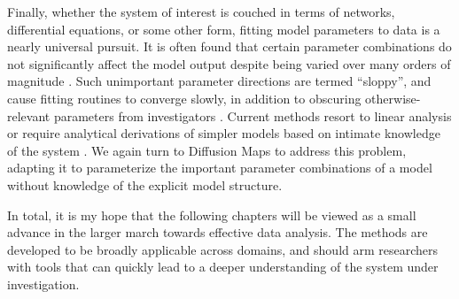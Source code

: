 Finally, whether the system of interest is couched in terms of
networks, differential equations, or some other form, fitting model
parameters to data is a nearly universal pursuit. It is often found
that certain parameter combinations do not significantly affect the
model output despite being varied over many orders of magnitude
\cite{gutenkunst_universally_2007}. Such unimportant parameter
directions are termed ``sloppy'', and cause fitting routines to
converge slowly, in addition to obscuring otherwise-relevant
parameters from investigators \cite{transtrum_geometry_2011}. Current
methods resort to linear analysis or require analytical derivations of
simpler models based on intimate knowledge of the system
\cite{saltelli_front_2002,transtrum_model_2014}. We again turn to
Diffusion Maps to address this problem, adapting it to parameterize
the important parameter combinations of a model without knowledge of
the explicit model structure.

In total, it is my hope that the following chapters will be viewed as
a small advance in the larger march towards effective data
analysis. The methods are developed to be broadly applicable across
domains, and should arm researchers with tools that can quickly lead
to a deeper understanding of the system under investigation.












